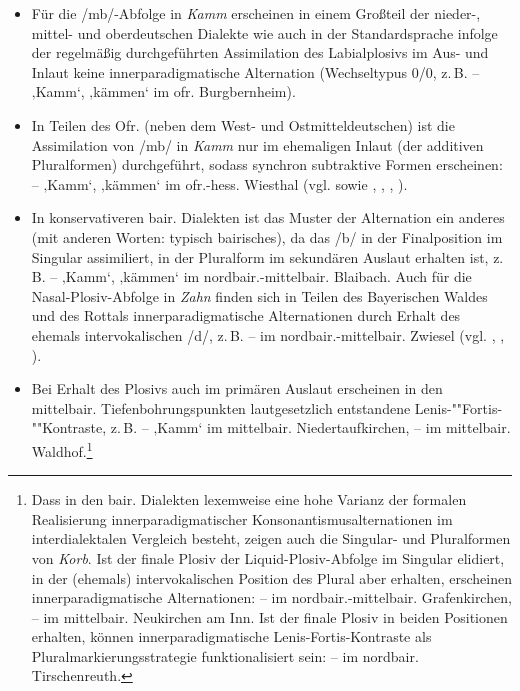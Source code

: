 \begin{itemize}
\item Für die /mb/-Abfolge in \textit{Kamm} erscheinen in einem Großteil der nieder-, mittel- und oberdeutschen Dialekte wie auch in der Standardsprache infolge der regelmäßig durchgeführten Assimilation des Labialplosivs im Aus- und Inlaut keine innerparadigmatische Alternation (Wechseltypus 0/0, z.\,B.  --  ‚Kamm‘,  ‚kämmen‘ im ofr. Burgbernheim).
\item In Teilen des Ofr. (neben dem West- und Ostmitteldeutschen) ist die Assimilation von /mb/ in \textit{Kamm} nur im ehemaligen Inlaut (der additiven Pluralformen) durchgeführt, sodass synchron subtraktive Formen erscheinen:  --  ‚Kamm‘,  ‚kämmen‘ im ofr.-hess. Wiesthal (vgl.  sowie \citealt[76--78]{Birkenes2014}, \citealt[392--393]{Schirmunski1962}, \citealt[Karte 162]{SUF1}, \citealt[Karte 26]{SUF3}).
\item In konservativeren bair. Dialekten ist das Muster der Alternation ein anderes (mit anderen Worten: typisch bairisches), da das /b/ in der Finalposition im Singular assimiliert, in der Pluralform im sekundären Auslaut erhalten ist, z.\,B.  --  ‚Kamm‘,  ‚kämmen‘ im nordbair.-mittelbair. Blaibach. Auch für die Nasal-Plosiv-Abfolge in \textit{Zahn} finden sich in Teilen des Bayerischen Waldes und des Rottals innerparadigmatische Alternationen durch Erhalt des ehemals intervokalischen /d/, z.\,B.  --  im nordbair.-mittelbair. Zwiesel (vgl. \citealt[§28c]{Kranzmayer1956}, \citealt[Karte 82]{SOB4}, \citealt[32 und 160]{SNiB4}).
\item Bei Erhalt des Plosivs auch im primären Auslaut erscheinen in den mittelbair. Tiefenbohrungspunkten lautgesetzlich entstandene Le\-nis-""For\-tis-""Kon\-tras\-te, z.\,B.  --  ‚Kamm‘ im mittelbair. Niedertaufkirchen, \mbox{} --  im mittelbair. Waldhof.\footnote{Dass in den bair. Dialekten lexemweise eine hohe Varianz der formalen Realisierung \textrm{innerparadigmatischer Konsonantismusalternationen} im \textrm{interdialektalen Vergleich besteht,} zeigen auch \textrm{die Singular- und Pluralformen von} \textit{Korb}\textrm{. Ist der finale Plosiv der Liquid-Plosiv-Abfolge im Singular elidiert, in der (ehemals) intervokalischen Position des Plural aber erhalten, erscheinen innerparadigmatische Alternationen:  --  im n}ordbair.-mittelbair. Grafenkirchen,  --  \textrm{im} mittelbair. Neukirchen am Inn. Ist der finale Plosiv in beiden Positionen erhalten, können innerparadigmatische Lenis-Fortis-Kontraste als Pluralmarkierungsstrategie funktionalisiert sein:  --  im nordbair. Tirschenreuth.}

\end{itemize}
